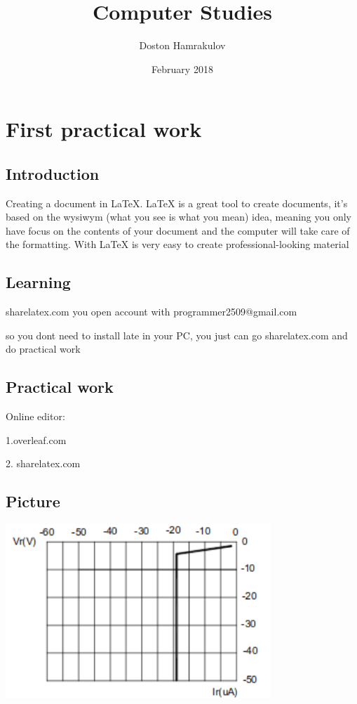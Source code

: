 \documentclass{report}
\title{Computer Studies}
\author{Doston Hamrakulov }
\date{February 2018}
\begin{document}
\maketitle

\chapter{First practical work}
\section{Introduction}

Creating a document in LaTeX. LaTeX is a great tool to create documents, it's based on the wysiwym (what you see is what you mean) idea, meaning you only have focus on the contents of your document and the computer will take care of the formatting. With LaTeX is very easy to create professional-looking material

\section{Learning}

sharelatex.com
you open account with programmer2509@gmail.com

so you dont need to install late in your PC, you just can go sharelatex.com and do practical work

\section{Practical work}

Online editor:

1.overleaf.com

2. sharelatex.com



\section{Picture}

\includegraphics[width=10cm]{First.png}
\end{document}
